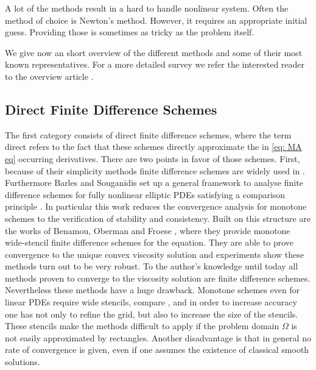 A lot of the methods result in a hard to handle nonlinear system. Often the method of choice is Newton's method. However, it requires an appropriate initial guess. Providing those is sometimes as tricky as the problem itself.

We give now an short overview of the different methods and some of their most known representatives. For a more detailed survey we refer the interested reader to the overview article \cite{FGN2013}.


\subsection{Direct Finite Difference Schemes}

The first category consists of direct finite difference schemes, where the term direct refers to the fact that these schemes directly approximate the in \eqref{eq: MA eq} occurring derivatives. 
There are two points in favor of those schemes. First, because of their simplicity methods finite difference schemes are widely used in . Furthermore Barles and Souganidis set up a general framework to analyse finite difference schemes for fully nonlinear elliptic PDEs satisfying a comparison principle \cite{BS1991}. In particular this work reduces the convergence analysis for monotone schemes to the verification of stability and consistency.
Built on this structure are the works of Benamou, Oberman and Froese \cite{BFO2010, Oberman2008, FO2011}, where they provide monotone wide-stencil finite difference schemes for the \MA equation.
They are able to prove convergence to the unique convex viscosity solution and experiments show these methods turn out to be very robust. To the author's knowledge until today all methods proven to converge to the viscosity solution are finite difference schemes.
Nevertheless these methods have a huge drawback. Monotone schemes even for linear PDEs require wide stencils, compare \cite{MW1953}, and in order to increase accuracy one has not only to refine the grid, but also to increase the size of the stencils. These stencils make the methods difficult to apply if the problem domain $\Omega$ is not easily approximated by rectangles. Another disadvantage is that in general no rate of convergence is given, even if one assumes the existence of classical smooth solutions.

